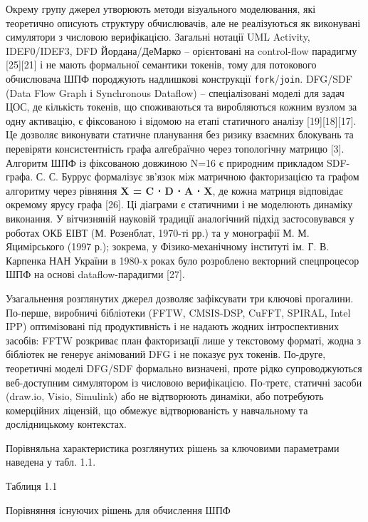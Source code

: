 \documentclass[
]{article}
\newcommand{\passthrough}[1]{#1}
\begin{document}
Окрему групу джерел утворюють методи візуального моделювання, які
теоретично описують структуру обчислювачів, але не реалізуються як
виконувані симулятори з числовою верифікацією. Загальні нотації UML
Activity, IDEF0/IDEF3, DFD Йордана/ДеМарко -- орієнтовані на
control-flow парадигму {[}25{]}{[}21{]} і не мають формальної семантики
токенів, тому для потокового обчислювача ШПФ породжують надлишкові
конструкції
\passthrough{\lstinline!fork!}/\passthrough{\lstinline!join!}. DFG/SDF
(Data Flow Graph і Synchronous Dataflow) -- спеціалізовані моделі для
задач ЦОС, де кількість токенів, що споживаються та виробляються кожним
вузлом за одну активацію, є фіксованою і відомою на етапі статичного
аналізу {[}19{]}{[}18{]}{[}17{]}. Це дозволяє виконувати статичне
планування без ризику взаємних блокувань та перевіряти консистентність
графа алгебраїчно через топологічну матрицю {[}3{]}. Алгоритм ШПФ із
фіксованою довжиною N=16 є природним прикладом SDF-графа. С. С. Буррус
формалізує зв'язок між матричною факторизацією та графом алгоритму через
рівняння \textbf{X\textquotesingle{} = C ⋅ D ⋅ A ⋅ X}, де кожна матриця
відповідає окремому ярусу графа {[}26{]}. Ці діаграми є статичними і не
моделюють динаміку виконання. У вітчизняній науковій традиції
аналогічний підхід застосовувався у роботах ОКБ ЕІВТ (М. Розенблат,
1970-ті рр.) та у монографії М. М. Яцимірського (1997 р.); зокрема, у
Фізико-механічному інституті ім. Г. В. Карпенка НАН України в 1980-х
роках було розроблено векторний спецпроцесор ШПФ на основі
dataflow-парадигми {[}27{]}.

Узагальнення розглянутих джерел дозволяє зафіксувати три ключові
прогалини. По-перше, виробничі бібліотеки (FFTW, CMSIS-DSP, CuFFT,
SPIRAL, Intel IPP) оптимізовані під продуктивність і не надають жодних
інтроспективних засобів: FFTW розкриває план факторизації лише у
текстовому форматі, жодна з бібліотек не генерує анімований DFG і не
показує рух токенів. По-друге, теоретичні моделі DFG/SDF формально
визначені, проте рідко супроводжуються веб-доступним симулятором із
числовою верифікацією. По-третє, статичні засоби (draw.io, Visio,
Simulink) або не відтворюють динаміки, або потребують комерційних
ліцензій, що обмежує відтворюваність у навчальному та дослідницькому
контекстах.

Порівняльна характеристика розглянутих рішень за ключовими параметрами
наведена у табл. 1.1.

Таблиця 1.1

Порівняння існуючих рішень для обчислення ШПФ
\end{document}
